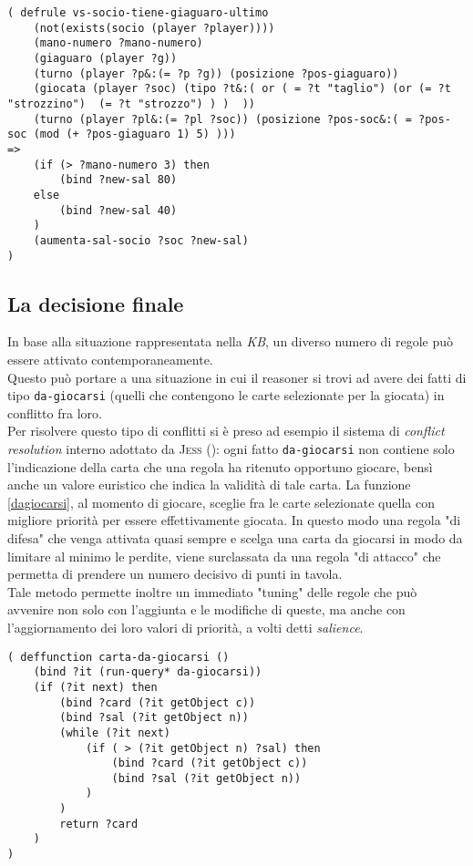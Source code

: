 \begin{lstlisting}[caption={Se qualcuno prende lasciando il giaguaro ultimo nella mano successiva, probabilmente è il socio, soprattutto se siamo durante la fase finale della partita},label=socio2]
( defrule vs-socio-tiene-giaguaro-ultimo
    (not(exists(socio (player ?player))))
    (mano-numero ?mano-numero)
    (giaguaro (player ?g))
    (turno (player ?p&:(= ?p ?g)) (posizione ?pos-giaguaro))
    (giocata (player ?soc) (tipo ?t&:( or ( = ?t "taglio") (or (= ?t "strozzino")  (= ?t "strozzo") ) )  ))
    (turno (player ?pl&:(= ?pl ?soc)) (posizione ?pos-soc&:( = ?pos-soc (mod (+ ?pos-giaguaro 1) 5) )))
=>
    (if (> ?mano-numero 3) then
        (bind ?new-sal 80)
    else
        (bind ?new-sal 40)
    )
    (aumenta-sal-socio ?soc ?new-sal)
)
\end{lstlisting}

\subsection{La decisione finale}

In base alla situazione rappresentata nella \emph{KB}, un diverso numero di regole può essere attivato contemporaneamente.\\
Questo può portare a una situazione in cui il reasoner si trovi ad avere dei fatti di tipo \texttt{da-giocarsi} (quelli che contengono le carte selezionate per la giocata) in conflitto fra loro.\\
Per risolvere questo tipo di conflitti si è preso ad esempio il sistema di \emph{conflict resolution} interno adottato da \textsc{Jess} (\cite{jessbook}): ogni fatto \texttt{da-giocarsi} non contiene solo l'indicazione della carta che una regola ha ritenuto opportuno giocare, bensì anche un valore euristico che indica la validità di tale carta.
La funzione \ref{dagiocarsi}, al momento di giocare, sceglie fra le carte selezionate quella con migliore priorità per essere effettivamente giocata.
In questo modo una regola "di difesa" che venga attivata quasi sempre e scelga una carta da giocarsi in modo da limitare al minimo le perdite, viene surclassata da una regola "di attacco" che permetta di prendere un numero decisivo di punti in tavola.\\
Tale metodo permette inoltre un immediato "tuning" delle regole che può avvenire non solo con l'aggiunta e le modifiche di queste, ma anche con l'aggiornamento dei loro valori di priorità, a volti detti \emph{salience}.

\begin{lstlisting}[caption={funzione che sceglie fra tutte quelle selezionate la carta da giocarsi},label=dagiocarsi]
( deffunction carta-da-giocarsi ()
    (bind ?it (run-query* da-giocarsi))
    (if (?it next) then
        (bind ?card (?it getObject c))
        (bind ?sal (?it getObject n))
        (while (?it next)
            (if ( > (?it getObject n) ?sal) then
                (bind ?card (?it getObject c))
                (bind ?sal (?it getObject n))
            )
        )
        return ?card
    )
)
\end{lstlisting}


